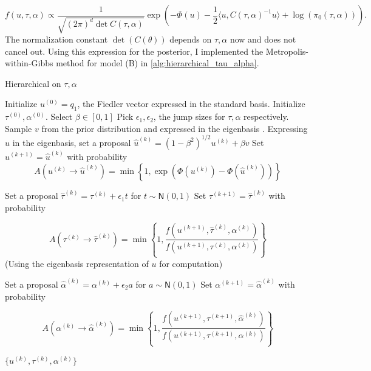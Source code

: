 \documentclass{siamart1116}
\begin{document}
        \begin{equation}
        \label{eqn:centered_post}
        f(u,\tau,\alpha) \propto 
        \frac{1}{\sqrt{(2\pi)^d \det C(\tau,\alpha)}} \exp\left(-\Phi(u)-\frac{1}{2}\langle u, C(\tau,\alpha)^{-1}u  \rangle + \log(\pi_0(\tau,\alpha)) \right).
        \end{equation}
        The normalization constant $\det(C(\theta))$ depends on $\tau, \alpha$ now and does not cancel out. Using this expression for the posterior, I implemented the Metropolis-within-Gibbs method for model (B) in \cref{alg:hierarchical_tau_alpha}.

        \begin{algorithm}
        \caption{Hierarchical on $\tau, \alpha$}
        \label{alg:hierarchical_tau_alpha}
        \begin{algorithmic}[1]
        \State Initialize $u^{(0)} = q_1$, the Fiedler vector expressed in the standard basis.
        \State Initialize $\tau^{(0)}, \alpha^{(0)}$. Select $\beta \in [0, 1]$
        \State Pick $\epsilon_1, \epsilon_2$, the jump sizes for $\tau, \alpha$ respectively.
        \State Sample $v$ from the prior distribution and expressed in the eigenbasis .
        \State Expressing $u$ in the eigenbasis, set a proposal $\hat u^{(k)} = (1- \beta^2)^{1/2}u^{(k)} + \beta v$
        \State Set $u^{(k+1)} = \hat u^{(k)}$ with probability 
        \[A(u^{(k)} \to \hat u^{(k)}) = \min \left\{1, \exp(\Phi(u^{(k)}) - \Phi(\hat u^{(k)})) \right\}\]

        \State Set a proposal $\hat \tau^{(k)} = \tau^{(k)} + \epsilon_1 t$ for $t \sim \mathsf{N}(0, 1)$ 
        \State Set $\tau^{(k+1)} = \hat \tau^{(k)}$ with probability 

        \[A(\tau^{(k)} \to \hat \tau^{(k)}) = \min \left\{ 1, \frac{f(u^{(k+1)}, \hat \tau^{(k)}, \alpha^{(k)})}{f(u^{(k+1)}, \tau^{(k)}, \alpha^{(k)})}\right\}\]
        (Using the eigenbasis representation of $u$ for computation) 

        \State Set a proposal $\hat \alpha^{(k)} = \alpha^{(k)} + \epsilon_2 a$ for $a \sim \mathsf{N}(0, 1)$ 
        \State Set $\alpha^{(k+1)} = \hat \alpha^{(k)}$ with probability

         \[A(\alpha^{(k)}\to\hat\alpha^{(k)}) = 
         \min\left\{1, 
         \frac{f(u^{(k+1)}, \tau^{(k+1)}, \hat \alpha^{(k)})}
         {f(u^{(k+1)}, \tau^{(k+1)}, \alpha^{(k)})}\right\}
         \]

        \EndFor
        \State \Return $\{u^{(k)}, \tau^{(k)}, \alpha^{(k)}\}$
        \end{algorithmic}
        \end{algorithm}
\end{document}
